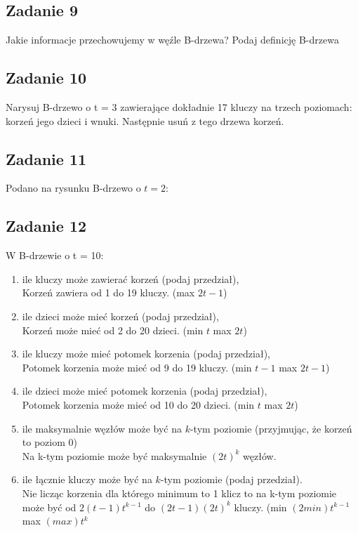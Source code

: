 \documentclass{article}
\begin{document}
\subsection*{Zadanie 9}
Jakie informacje przechowujemy w węźle B-drzewa? Podaj definicję B-drzewa

\subsection*{Zadanie 10}
Narysuj B-drzewo o t = 3 zawierające dokładnie 17 kluczy na trzech poziomach: korzeń jego
dzieci i wnuki. Następnie usuń z tego drzewa korzeń.

\subsection*{Zadanie 11}
Podano na rysunku B-drzewo o $t=2$:

\subsection*{Zadanie 12}
W B-drzewie o t = 10:
\begin{enumerate}[label=(\alph*)]
    \item ile kluczy może zawierać korzeń (podaj przedział), \\
          Korzeń zawiera od 1 do 19 kluczy. (max $2t-1$)
    \item ile dzieci może mieć korzeń (podaj przedział), \\
          Korzeń może mieć od 2 do 20 dzieci. (min $t$ max $2t$)
    \item ile kluczy może mieć potomek korzenia (podaj przedział), \\
          Potomek korzenia może mieć od 9 do 19 kluczy. (min $t-1$ max $2t-1$)
    \item ile dzieci może mieć potomek korzenia (podaj przedział), \\
          Potomek korzenia może mieć od 10 do 20 dzieci. (min $t$ max $2t$)
    \item ile maksymalnie węzłów może być na $k$-tym poziomie (przyjmując, że korzeń to poziom $0$) \\
          Na k-tym poziomie może być maksymalnie $(2t)^k$ węzłów.
    \item ile łącznie kluczy może być na $k$-tym poziomie (podaj przedział). \\
          Nie licząc korzenia dla którego minimum to 1 klicz to na k-tym poziomie może być od $2(t-1)t^{k-1}$ do $(2t-1)(2t)^{k}$ kluczy. (min $(2min)t^{k-1}$ max $(max)t^{k}$
\end{enumerate}
\end{document}
